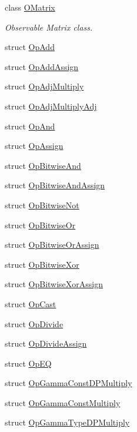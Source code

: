 \begin{DoxyCompactItemize}
class \mbox{\hyperlink{classENSEM_1_1OMatrix}{O\+Matrix}}
\begin{DoxyCompactList}\small\item\em Observable Matrix class. \end{DoxyCompactList}\item 
struct \mbox{\hyperlink{structENSEM_1_1OpAdd}{Op\+Add}}
\item 
struct \mbox{\hyperlink{structENSEM_1_1OpAddAssign}{Op\+Add\+Assign}}
\item 
struct \mbox{\hyperlink{structENSEM_1_1OpAdjMultiply}{Op\+Adj\+Multiply}}
\item 
struct \mbox{\hyperlink{structENSEM_1_1OpAdjMultiplyAdj}{Op\+Adj\+Multiply\+Adj}}
\item 
struct \mbox{\hyperlink{structENSEM_1_1OpAnd}{Op\+And}}
\item 
struct \mbox{\hyperlink{structENSEM_1_1OpAssign}{Op\+Assign}}
\item 
struct \mbox{\hyperlink{structENSEM_1_1OpBitwiseAnd}{Op\+Bitwise\+And}}
\item 
struct \mbox{\hyperlink{structENSEM_1_1OpBitwiseAndAssign}{Op\+Bitwise\+And\+Assign}}
\item 
struct \mbox{\hyperlink{structENSEM_1_1OpBitwiseNot}{Op\+Bitwise\+Not}}
\item 
struct \mbox{\hyperlink{structENSEM_1_1OpBitwiseOr}{Op\+Bitwise\+Or}}
\item 
struct \mbox{\hyperlink{structENSEM_1_1OpBitwiseOrAssign}{Op\+Bitwise\+Or\+Assign}}
\item 
struct \mbox{\hyperlink{structENSEM_1_1OpBitwiseXor}{Op\+Bitwise\+Xor}}
\item 
struct \mbox{\hyperlink{structENSEM_1_1OpBitwiseXorAssign}{Op\+Bitwise\+Xor\+Assign}}
\item 
struct \mbox{\hyperlink{structENSEM_1_1OpCast}{Op\+Cast}}
\item 
struct \mbox{\hyperlink{structENSEM_1_1OpDivide}{Op\+Divide}}
\item 
struct \mbox{\hyperlink{structENSEM_1_1OpDivideAssign}{Op\+Divide\+Assign}}
\item 
struct \mbox{\hyperlink{structENSEM_1_1OpEQ}{Op\+EQ}}
\item 
struct \mbox{\hyperlink{structENSEM_1_1OpGammaConstDPMultiply}{Op\+Gamma\+Const\+D\+P\+Multiply}}
\item 
struct \mbox{\hyperlink{structENSEM_1_1OpGammaConstMultiply}{Op\+Gamma\+Const\+Multiply}}
\item 
struct \mbox{\hyperlink{structENSEM_1_1OpGammaTypeDPMultiply}{Op\+Gamma\+Type\+D\+P\+Multiply}}

\end{DoxyCompactItemize}
